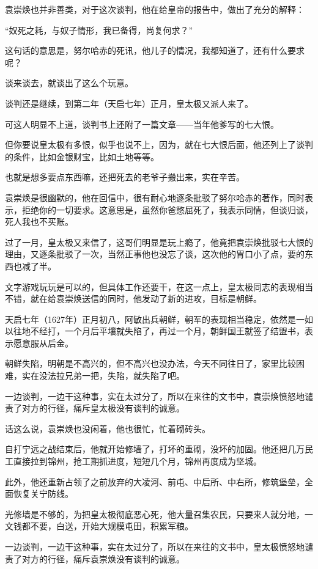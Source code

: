 \begin{multicols}{\theparacolNo}
袁崇焕也并非善类，对于这次谈判，他在给皇帝的报告中，做出了充分的解释：

“奴死之耗，与奴子情形，我已备得，尚复何求？”

这句话的意思是，努尔哈赤的死讯，他儿子的情况，我都知道了，还有什么要求呢？

谈来谈去，就谈出了这么个玩意。

谈判还是继续，到第二年（天启七年）正月，皇太极又派人来了。

可这人明显不上道，谈判书上还附了一篇文章——当年他爹写的七大恨。

但你要说皇太极有多恨，似乎也说不上，因为，就在七大恨后面，他还列上了谈判的条件，比如金银财宝，比如土地等等。

也就是想多要点东西嘛，还把死去的老爷子搬出来，实在辛苦。

袁崇焕是很幽默的，他在回信中，很有耐心地逐条批驳了努尔哈赤的著作，同时表示，拒绝你的一切要求。这意思是，虽然你爸憋屈死了，我表示同情，但谈归谈，死人我也不买账。

过了一月，皇太极又来信了，这哥们明显是玩上瘾了，他竟把袁崇焕批驳七大恨的理由，又逐条批驳了一次，当然正事他也没忘了谈，这次他的胃口小了点，要的东西也减了半。

文字游戏玩玩是可以的，但具体工作还要干，在这一点上，皇太极同志的表现相当不错，就在给袁崇焕送信的同时，他发动了新的进攻，目标是朝鲜。

天启七年（1627年）正月初八，阿敏出兵朝鲜，朝军的表现相当稳定，依然是一如以往地不经打，一个月后平壤就失陷了，再过一个月，朝鲜国王就签了结盟书，表示愿意服从后金。

朝鲜失陷，明朝是不高兴的，但不高兴也没办法，今天不同往日了，家里比较困难，实在没法拉兄弟一把，失陷，就失陷了吧。

一边谈判，一边干这种事，实在太过分了，所以在来往的文书中，袁崇焕愤怒地谴责了对方的行径，痛斥皇太极没有谈判的诚意。

话这么说，袁崇焕也没闲着，他也很忙，忙着砌砖头。

自打宁远之战结束后，他就开始修墙了，打坏的重砌，没坏的加固。他还把几万民工直接拉到锦州，抢工期抓进度，短短几个月，锦州再度成为坚城。

此外，他还重新占领了之前放弃的大凌河、前屯、中后所、中右所，修筑堡垒，全面恢复关宁防线。

光修墙是不够的，为把皇太极彻底恶心死，他大量召集农民，只要来人就分地，一文钱都不要，白送，开始大规模屯田，积累军粮。

一边谈判，一边干这种事，实在太过分了，所以在来往的文书中，皇太极愤怒地谴责了对方的行径，痛斥袁崇焕没有谈判的诚意。


\end{multicols}
